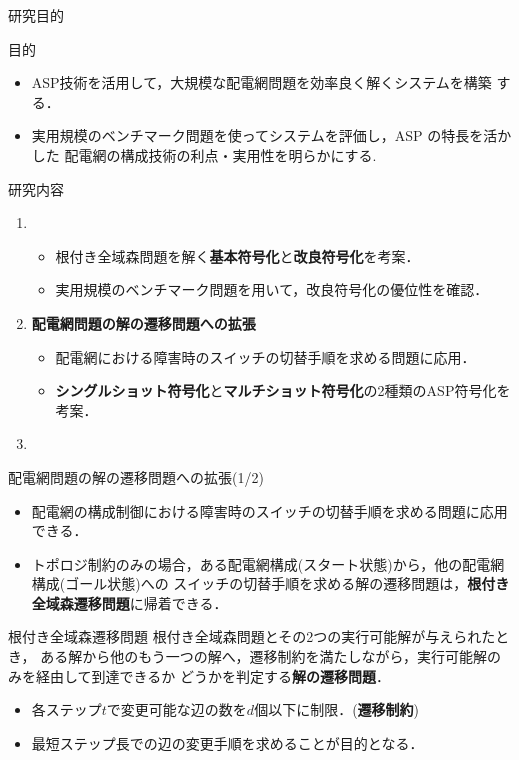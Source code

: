 \documentclass[dvipdfmx,11pt]{beamer}
\begin{document}
\begin{frame}{研究目的}
  \begin{alertblock}{目的}
\begin{itemize}
 \item ASP技術を活用して，大規模な配電網問題を効率良く解くシステムを構築
       する．
 \item 実用規模のベンチマーク問題を使ってシステムを評価し，ASP の特長を活かした
       配電網の構成技術の利点・実用性を明らかにする.
\end{itemize}
  \end{alertblock}
  \vfill
 \begin{block}{研究内容}
  \begin{enumerate}
   \item {}
   \begin{itemize}
    \item 根付き全域森問題を解く\textbf{基本符号化}と\textbf{改良符号化}を考案．
    \item 実用規模のベンチマーク問題を用いて，改良符号化の優位性を確認．
   \end{itemize}
   \item \alert{\bf 配電網問題の解の遷移問題への拡張}
   \begin{itemize}
    \item 配電網における障害時のスイッチの切替手順を求める問題に応用．
    \item \textbf{シングルショット符号化}と\textbf{マルチショット符号化}の2種類のASP符号化を考案．
   \end{itemize}
   \item {}
  \end{enumerate}
 \end{block}
\end{frame}
\begin{frame}{配電網問題の解の遷移問題への拡張(1/2)}
 \begin{itemize}
  \item 配電網の構成制御における障害時のスイッチの切替手順を求める問題に応用できる．
  \item トポロジ制約のみの場合，ある配電網構成(スタート状態)から，他の配電網構成(ゴール状態)への
        スイッチの切替手順を求める解の遷移問題は，\alert{\bf 根付き全域森遷移問題}に帰着できる．
 \end{itemize}
 \begin{block}{根付き全域森遷移問題}
  根付き全域森問題とその2つの実行可能解が与えられたとき，
  ある解から他のもう一つの解へ，遷移制約を満たしながら，実行可能解のみを経由して到達できるか
  どうかを判定する\alert{\bf 解の遷移問題}．
  \begin{itemize}
  \item 各ステップ$t$で変更可能な辺の数を$d$個以下に制限．(\textbf{遷移制約})
  \item 最短ステップ長での辺の変更手順を求めることが目的となる．
  \end{itemize}
 \end{block} 
\end{frame}
\end{document}
